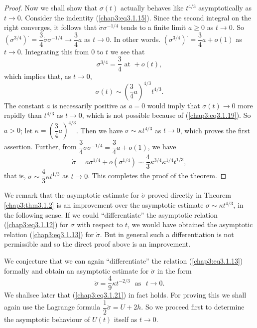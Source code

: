 \begin{proof}
Now we shall show that $\sigma (t)$ actually behaves like $t^{4/3}$
asymptotically as $t \to 0$. Consider the indentity (\ref{chap3:eq3.1.15}). Since
the second integral on the right converges, it follows that
$\dot{\sigma} \sigma^{-1/4}$ tends to a finite limit $a \geq 0$ as $t
\to 0$. So $(\sigma^{3/4})^. = \dfrac{3}{4} \dot{\sigma} \sigma^{-1/4}
\to \dfrac{3}{4} a$ as $t \to 0$. In other words. $(\sigma^{3/4})^. =
\dfrac{3}{4} a + o (1)$ as $t \to 0$. Integrating this from 0 to $t$
we see that 
$$
\sigma^{3/4} = \dfrac{3}{4} \text{ at } + o (t),
$$\pageoriginale
which implies that, as $t\to 0$,
\begin{equation*}
\sigma (t) \sim (\frac{3}{4} a)^{4/3}
t^{4/3}. \tag{3.1.20}\label{chap3:eq3.1.20} 
\end{equation*}
The constant $a$ is necessarily positive as $a = 0$ would imply that
$\sigma (t) \to 0$ more rapidly than $t^{4/3}$ as $t \to 0$, which is
not possible because of (\ref{chap3:eq3.1.19}). So $a > 0$; let $\kappa =
(\dfrac{3}{4} a)^{4/3}$. Then we have $\sigma \sim \kappa t^{4/3}$ as
$t \to 0$, which proves the first assertion. Further, from
$\dfrac{3}{4} \dot{\sigma} \sigma^{-1/4} = \dfrac{3}{4} a + o (1)$, we
have
$$
\dot{\sigma} = a\sigma^{1/4} + o (\sigma^{1/4}) \sim \frac{4}{3}
\kappa^{3/4} \kappa^{1/4} t^{1/3}, 
$$
that is, $\dot{\sigma} \sim \dfrac{4}{3} \kappa t^{1/3}$ as $t \to
0$. This completes the proof of the theorem.
\end{proof}

We remark that the asymptotic estimate for $\dot{\sigma}$ proved
directly in Theorem \ref{chap3:thm3.1.2} is an improvement over the
asymptotic 
estimate $\sigma \sim \kappa t^{4/3}$, in the following sense. If we 
could ``differentiate'' the asymptotic relation (\ref{chap3:eq3.1.12})
for $\sigma$ 
with respect to $t$, we would have obtained the asymptotic relation
(\ref{chap3:eq3.1.13}) for $\dot{\sigma}$. But in general such a
differentiation is 
not permissible and so the direct proof above is an improvement.

We conjecture that we can again ``differentiate'' the relation
(\ref{chap3:eq3.1.13}) formally and obtain an asymptotic estimate for
$\ddot{\sigma}$ in the form
\begin{equation*}
\ddot{\sigma} = \frac{4}{9} \kappa t^{-2/3} \text{~ as ~} t \to
0. \tag{3.1.21}\label{chap3:eq3.1.21} 
\end{equation*}
We shall\pageoriginale see later that (\ref{chap3:eq3.1.21}) in fact holds. For
proving this we shall again use the Lagrange formula $\dfrac{1}{2}
\ddot{\sigma} = U + 2h $. So we proceed first to determine the
asymptotic behaviour of $U(t)$ itself as $t \to 0$.

